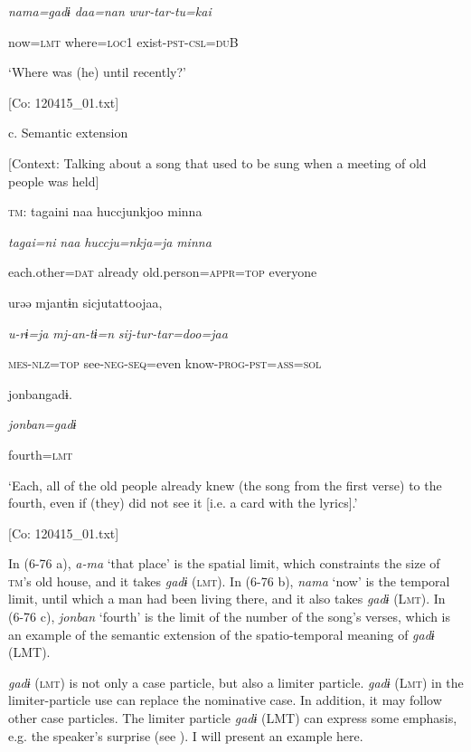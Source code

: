     \textit{nama=gadɨ}  \textit{daa=nan}  \textit{wur-tar-tu=kai}

    now=\textsc{lmt}  where=\textsc{loc}1  exist-\textsc{pst}-\textsc{csl}=\textsc{du}B

    ‘Where was (he) until recently?’

    [Co: 120415\_01.txt]

  c. Semantic extension

  [Context: Talking about a song that used to be sung when a meeting of old people was held]

  \textsc{tm}:  {\textbar}tagaini{\textbar}  naa  huccjunkjoo  minna

    \textit{tagai=ni}  \textit{naa}  \textit{huccju=nkja=ja}  \textit{minna}

    each.other=\textsc{dat}  already  old.person=\textsc{appr}=\textsc{top}  everyone

    urəə  mjantɨn  sicjutattoojaa,

    \textit{u-rɨ=ja}  \textit{mj-an-tɨ=n}  \textit{sij-tur-tar=doo=jaa}

    \textsc{mes}-\textsc{nlz}=\textsc{top}  see-\textsc{neg}-\textsc{seq}=even  know-\textsc{prog}-\textsc{pst}=\textsc{ass}=\textsc{sol}

    {\textbar}jonban{\textbar}gadɨ.

    \textit{jonban=gadɨ}

    fourth=\textsc{lmt}

    ‘Each, all of the old people already knew (the song from the first verse) to the fourth, even if (they) did not see it [i.e. a card with the lyrics].’

    [Co: 120415\_01.txt]

In (6-76 a), \textit{a-ma} ‘that place’ is the spatial limit, which constraints the size of \textsc{tm}’s old house, and it takes \textit{gadɨ} (\textsc{lmt}). In (6-76 b), \textit{nama} ‘now’ is the temporal limit, until which a man had been living there, and it also takes \textit{gadɨ} (L\textsc{mt}). In (6-76 c), \textit{jonban} ‘fourth’ is the limit of the number of the song’s verses, which is an example of the semantic extension of the spatio-temporal meaning of \textit{gadɨ} (LMT).

\textit{gadɨ} (\textsc{lmt}) is not only a case particle, but also a limiter particle. \textit{gadɨ} (L\textsc{mt}) in the limiter-particle use can replace the nominative case. In addition, it may follow other case particles. The limiter particle \textit{gadɨ} (LMT) can express some emphasis, e.g. the speaker’s surprise (see ). I will present an example here.

